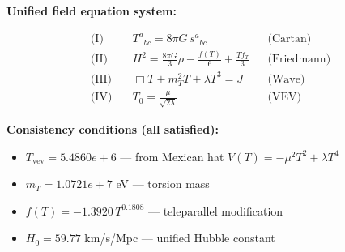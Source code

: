
\textbf{Unified field equation system:}

\begin{align}
  \text{(I)} \quad & T^a{}_{bc} = 8\pi G \, s^a{}_{bc} && \text{(Cartan)} \\
  \text{(II)} \quad & H^2 = \frac{8\pi G}{3}\rho - \frac{f(T)}{6} + \frac{Tf_T}{3} && \text{(Friedmann)} \\
  \text{(III)} \quad & \Box T + m_T^2 T + \lambda T^3 = J && \text{(Wave)} \\
  \text{(IV)} \quad & T_0 = \frac{\mu}{\sqrt{2\lambda}} && \text{(VEV)}
\end{align}

\textbf{Consistency conditions (all satisfied):}
\begin{itemize}
  \item $T_{\text{vev}} = 5.4860e+6$ — from Mexican hat $V(T) = -\mu^2 T^2 + \lambda T^4$
  \item $m_T = 1.0721e+7$ eV — torsion mass
  \item $f(T) = -1.3920 \, T^{0.1808}$ — teleparallel modification
  \item $H_0 = 59.77$ km/s/Mpc — unified Hubble constant
\end{itemize}